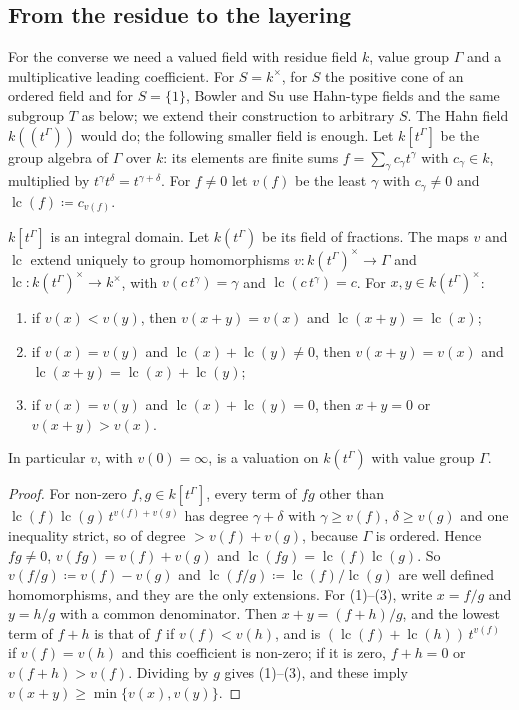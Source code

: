 \documentclass[11pt]{amsart}
\numberwithin{equation}{section}
\begin{document}
\subsection{From the residue to the layering}
For the converse we need a valued field with residue field $k$, value group $\Gamma$ and a multiplicative leading coefficient. For $S=k^\times$, for $S$ the positive cone of an ordered field and for $S=\{1\}$, Bowler and Su \cite[proof of Theorem~7.5, Cases~1--3]{BowlerSu21} use Hahn-type fields and the same subgroup $T$ as below; we extend their construction to arbitrary $S$. The Hahn field $k(\!(t^\Gamma)\!)$ would do; the following smaller field is enough. Let $k[t^\Gamma]$ be the group algebra of $\Gamma$ over $k$: its elements are finite sums $f=\sum_\gamma c_\gamma t^\gamma$ with $c_\gamma\in k$, multiplied by $t^\gamma t^\delta=t^{\gamma+\delta}$. For $f\ne0$ let $v(f)$ be the least $\gamma$ with $c_\gamma\ne0$ and $\operatorname{lc}(f)\coloneqq c_{v(f)}$.

\begin{lemma}\label{lem:group-field}
$k[t^\Gamma]$ is an integral domain. Let $k(t^\Gamma)$ be its field of fractions. The maps $v$ and $\operatorname{lc}$ extend uniquely to group homomorphisms $v\colon k(t^\Gamma)^\times\to\Gamma$ and $\operatorname{lc}\colon k(t^\Gamma)^\times\to k^\times$, with $v(c\,t^\gamma)=\gamma$ and $\operatorname{lc}(c\,t^\gamma)=c$. For $x,y\in k(t^\Gamma)^\times$:
\begin{enumerate}
\item if $v(x)<v(y)$, then $v(x+y)=v(x)$ and $\operatorname{lc}(x+y)=\operatorname{lc}(x)$;
\item if $v(x)=v(y)$ and $\operatorname{lc}(x)+\operatorname{lc}(y)\ne0$, then $v(x+y)=v(x)$ and $\operatorname{lc}(x+y)=\operatorname{lc}(x)+\operatorname{lc}(y)$;
\item if $v(x)=v(y)$ and $\operatorname{lc}(x)+\operatorname{lc}(y)=0$, then $x+y=0$ or $v(x+y)>v(x)$.
\end{enumerate}
In particular $v$, with $v(0)=\infty$, is a valuation on $k(t^\Gamma)$ with value group $\Gamma$.
\end{lemma}

\begin{proof}
For non-zero $f,g\in k[t^\Gamma]$, every term of $fg$ other than $\operatorname{lc}(f)\operatorname{lc}(g)\,t^{v(f)+v(g)}$ has degree $\gamma+\delta$ with $\gamma\ge v(f)$, $\delta\ge v(g)$ and one inequality strict, so of degree $>v(f)+v(g)$, because $\Gamma$ is ordered. Hence $fg\ne0$, $v(fg)=v(f)+v(g)$ and $\operatorname{lc}(fg)=\operatorname{lc}(f)\operatorname{lc}(g)$. So $v(f/g)\coloneqq v(f)-v(g)$ and $\operatorname{lc}(f/g)\coloneqq\operatorname{lc}(f)/\operatorname{lc}(g)$ are well defined homomorphisms, and they are the only extensions. For (1)--(3), write $x=f/g$ and $y=h/g$ with a common denominator. Then $x+y=(f+h)/g$, and the lowest term of $f+h$ is that of $f$ if $v(f)<v(h)$, and is $(\operatorname{lc}(f)+\operatorname{lc}(h))\,t^{v(f)}$ if $v(f)=v(h)$ and this coefficient is non-zero; if it is zero, $f+h=0$ or $v(f+h)>v(f)$. Dividing by $g$ gives (1)--(3), and these imply $v(x+y)\ge\min\{v(x),v(y)\}$.
\end{proof}
\end{document}

